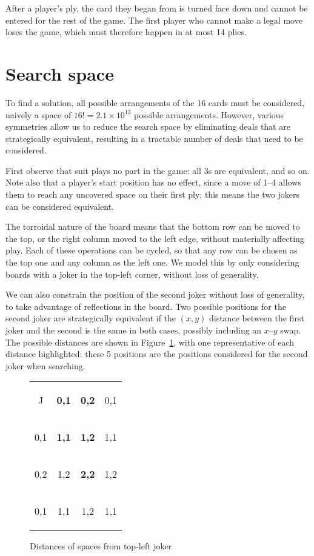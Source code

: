\documentclass[a4paper, twocolumn]{article}
\newcommand\card[1]{\begin{tcolorbox}#1\end{tcolorbox}}
\begin{document}
After a player's ply, the card they began from is turned face down and cannot
be entered for the rest of the game. The first player who cannot make a legal
move loses the game, which must therefore happen in at most 14 plies.


\section{Search space}

To find a solution, all possible arrangements of the 16 cards must be
considered, naively a space of $16! = 2.1 \times 10^{13}$ possible
arrangements. However, various symmetries allow us to reduce the search space by
eliminating deals that are strategically equivalent, resulting in a tractable
number of deals that need to be considered.

First observe that suit plays no part in the game: all 3s are equivalent, and so
on. Note also that a player's start position has no effect, since a move of 1--4
allows them to reach any uncovered space on their first ply; this means the two
jokers can be considered equivalent.

The torroidal nature of the board means that the bottom row can be moved to the
top, or the right column moved to the left edge, without materially affecting
play. Each of these operations can be cycled, so that any row can be chosen as
the top one and any column as the left one. We model this by only considering
boards with a joker in the top-left corner, without loss of generality.

We can also constrain the position of the second joker without loss of
generality, to take advantage of reflections in the board. Two possible
positions for the second joker are strategically equivalent if the $(x, y)$
distance between the first joker and the second is the same in both cases,
possibly including an $x$--$y$ swap. The possible distances are shown in
Figure~\ref{fig:joker-distances}, with one representative of each distance
highlighted: these 5 positions are the positions considered for the second joker
when searching.

\begin{figure}[h]
  \centering
  \begin{tabular}{c c c c}
    \card{J} & \card{\textbf{0,1}} & \card{\textbf{0,2}} & \card{0,1} \\
    \card{0,1} & \card{\textbf{1,1}} & \card{\textbf{1,2}} & \card{1,1} \\
    \card{0,2} & \card{1,2} & \card{\textbf{2,2}} & \card{1,2} \\
    \card{0,1} & \card{1,1} & \card{1,2} & \card{1,1}
  \end{tabular}

  \caption{Distances of spaces from top-left joker}
  \label{fig:joker-distances}
\end{figure}
\end{document}
